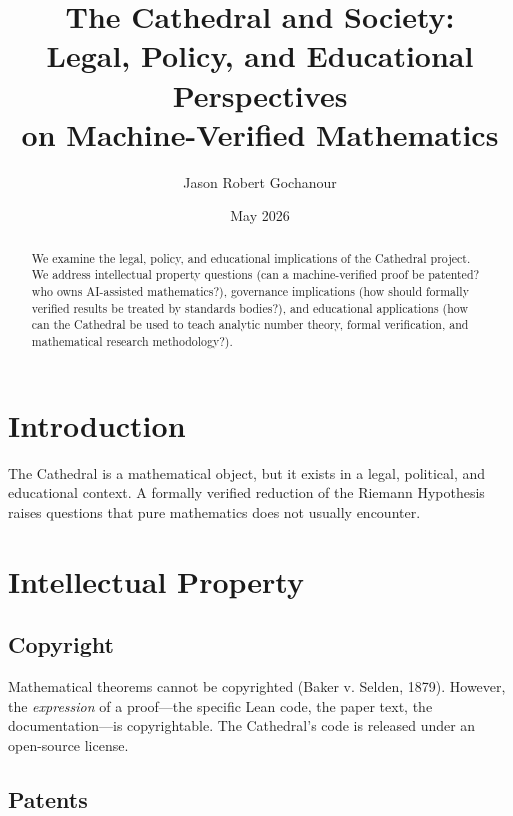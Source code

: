 \documentclass[11pt,a4paper]{article}
\title{%
  The Cathedral and Society:\\
  Legal, Policy, and Educational Perspectives\\
  on Machine-Verified Mathematics%
}
\author{Jason Robert Gochanour}
\date{May 2026}
\begin{document}
\maketitle

\begin{abstract}
We examine the legal, policy, and educational implications of the
Cathedral project. We address intellectual property questions
(can a machine-verified proof be patented? who owns AI-assisted
mathematics?), governance implications (how should formally
verified results be treated by standards bodies?), and educational
applications (how can the Cathedral be used to teach analytic number
theory, formal verification, and mathematical research methodology?).
\end{abstract}

\tableofcontents

\section{Introduction}

The Cathedral is a mathematical object, but it exists in a legal,
political, and educational context. A formally verified reduction
of the Riemann Hypothesis raises questions that pure mathematics
does not usually encounter.

\section{Intellectual Property}

\subsection{Copyright}

Mathematical theorems cannot be copyrighted (Baker v. Selden, 1879).
However, the \emph{expression} of a proof---the specific Lean code,
the paper text, the documentation---is copyrightable. The Cathedral's
code is released under an open-source license.

\subsection{Patents}
\end{document}
